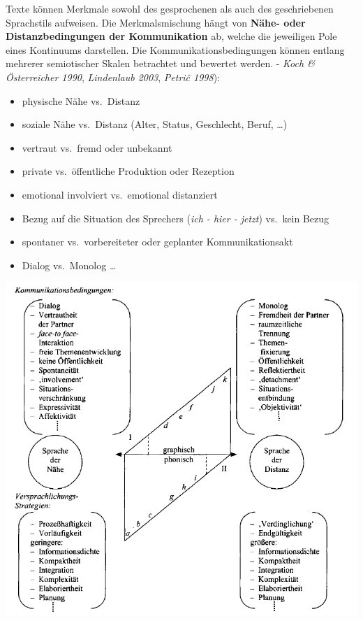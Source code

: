\documentclass[
  letterpaper,
]{scrbook}
\providecommand{\tightlist}{%
  \setlength{\itemsep}{0pt}\setlength{\parskip}{0pt}}\usepackage{longtable,booktabs,array}
\begin{document}
Texte können Merkmale sowohl des gesprochenen als auch des geschriebenen
Sprachstils aufweisen. Die Merkmalsmischung hängt von \textbf{Nähe- oder
Distanzbedingungen der Kommunikation} ab, welche die jeweiligen Pole
eines Kontinuums darstellen. Die Kommunikationsbedingungen können
entlang mehrerer semiotischer Skalen betrachtet und bewertet werden. -
\emph{Koch \& Österreicher 1990}, \emph{Lindenlaub 2003}, \emph{Petrič
1998}):

\begin{itemize}
\tightlist
\item
  physische Nähe vs.~Distanz\\
\item
  soziale Nähe vs.~Distanz (Alter, Status, Geschlecht, Beruf, \ldots)\\
\item
  vertraut vs.~fremd oder unbekannt\\
\item
  private vs.~öffentliche Produktion oder Rezeption\\
\item
  emotional involviert vs.~emotional distanziert\\
\item
  Bezug auf die Situation des Sprechers (\emph{ich - hier - jetzt})
  vs.~kein Bezug\\
\item
  spontaner vs.~vorbereiteter oder geplanter Kommunikationsakt\\
\item
  Dialog vs.~Monolog \ldots{}
\end{itemize}

\includegraphics[width=1\textwidth,height=\textheight]{./pictures/nahe_distanz_diagram1.png}
\end{document}
